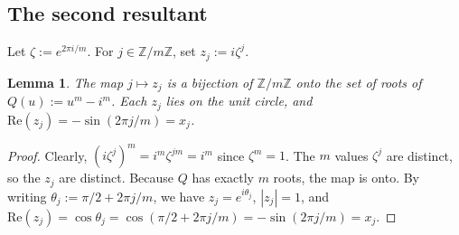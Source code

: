 \documentclass[11pt,reqno]{amsart}
\newtheorem{lemma}[theorem]{Lemma}
\theoremstyle{remark}
\newtheorem{remark}[theorem]{Remark}
\begin{document}

\subsection{The second resultant}

Let $\zeta:=e^{2\pi i/m}$.  For $j\in\mathbb Z/m\mathbb Z$, set
$z_j:=i\zeta^j$.

\begin{lemma}
\label{lem:root-param}
The map $j\mapsto z_j$ is a bijection of $\mathbb Z/m\mathbb Z$ onto the
set of roots of $Q(u):=u^m-i^m$. Each $z_j$ lies on the unit circle,
and $\mathrm{Re}(z_j)=-\sin(2\pi j/m)=x_j$.
\end{lemma}

\begin{proof} Clearly,
$(i\zeta^j)^m=i^m\zeta^{jm}=i^m$ since $\zeta^m=1$.  The $m$ values
$\zeta^j$ are distinct, so the $z_j$ are distinct.  Because $Q$ has
exactly $m$ roots, the map is onto.
By writing $\theta_j:=\pi/2+2\pi j/m$, we have $z_j=e^{i\theta_j}$, $|z_j|=1$,  and
$\mathrm{Re}(z_j)=\cos\theta_j=\cos(\pi/2+2\pi j/m)=-\sin(2\pi j/m)=x_j$.
\end{proof}
\end{document}

